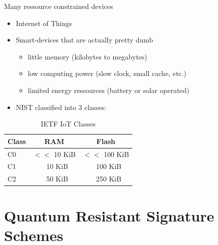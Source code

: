 \documentclass[ucs,10pt]{beamer}
\begin{document}
\begin{frame}{Many ressource constrained devices}
  \begin{itemize}
  \item
    Internet of Things 
  \item
    Smart-devices that are actually pretty dumb
    \begin{itemize}
      \item little memory (kilobytes to megabytes)
      \item low computing power (slow clock, small cache, etc.)
      \item limited energy ressources (battery or solar operated)
    \end{itemize}
  \item
    NIST classified into 3 classes:
  \end{itemize}
  \begin{table}
    \label{IoT-classes}
    \centering
    \caption{IETF IoT Classes}
    \begin{tabular}{|l | c c|}
        \hline
        Class & RAM & Flash \\
        \hline
        C0 & $<<$ 10 KiB & $<<$ 100 KiB\\
        C1 & ~ 10 KiB & ~ 100 KiB\\
        C2 & ~ 50 KiB & ~ 250 KiB\\
        \hline
    \end{tabular} 
\end{table}
\end{frame}

\section{Quantum Resistant Signature Schemes}
\end{document}
